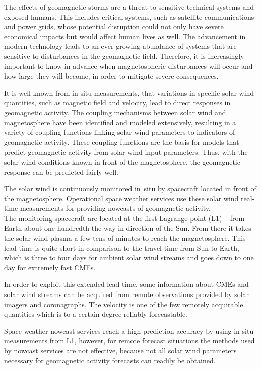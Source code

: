 The effects of geomagnetic storms are a threat to sensitive technical systems and exposed humans. This includes critical systems, such as satellite communications and power grids, whose potential disruption could not only have severe economical impacts but would affect human lives as well. The advancement in modern technology leads to an ever-growing abundance of systems that are sensitive to disturbances in the geomagnetic field. Therefore, it is increasingly important to know in advance when magnetospheric disturbances will occur and how large they will become, in order to mitigate severe consequences.

It is well known from in-situ measurements, that variations in specific solar wind quantities, such as magnetic field and velocity, lead to direct responses in geomagnetic activity. The coupling mechanisms between solar wind and magnetosphere have been identified and modeled extensively, resulting in a variety of coupling functions linking solar wind parameters to indicators of geomagnetic activity. These coupling functions are the basis for models that predict geomagnetic activity from solar wind input parameters. Thus, with the solar wind conditions known in front of the magnetosphere, the geomagnetic response can be predicted fairly well.

The solar wind is continuously monitored in~situ by spacecraft located in front of the magnetosphere. Operational space weather services use these solar wind real-time measurements for providing nowcasts of geomagnetic activity.\\

The monitoring spacecraft are located at the first Lagrange point (L1) -- from Earth about one-hundredth the way in direction of the Sun.
From there it takes the solar wind plasma a few tens of minutes to reach the magnetosphere. This lead time is quite short in comparison to the travel time from Sun to Earth, which is three to four days for ambient solar wind streams and goes down to one day for extremely fast CMEs.

In order to exploit this extended lead time, some information about CMEs and solar wind streams can be acquired from remote observations provided by solar imagers and coronagraphs. The velocity is one of the few remotely acquirable quantities which is to a certain degree reliably forecastable.

Space weather nowcast services reach a high prediction accuracy by using in-situ measurements from L1, however, for remote forecast situations the methods used by nowcast services are not effective, because not all solar wind parameters necessary for geomagnetic activity forecasts can readily be obtained.\\

